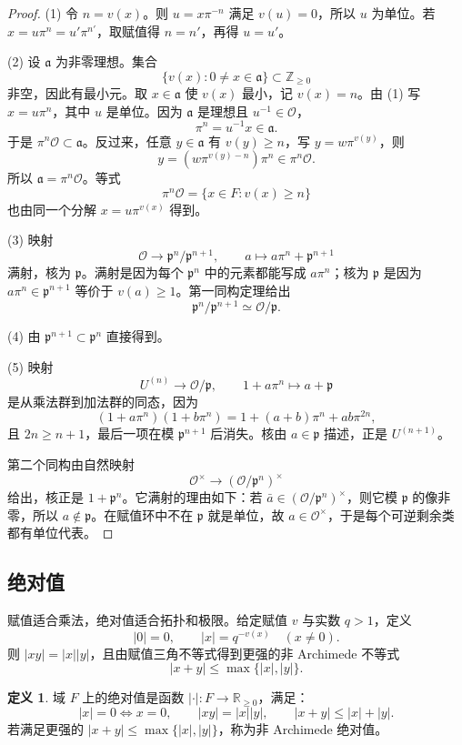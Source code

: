 \documentclass[11pt,a4paper,openany]{ctexbook}
\numberwithin{equation}{chapter}
\newcommand{\R}{\mathbb{R}}
\newcommand{\Z}{\mathbb{Z}}
\theoremstyle{plain}
\theoremstyle{definition}
\newtheorem{definition}[theorem]{定义}
\theoremstyle{remark}
\begin{document}
\begin{proof}
(1) 令 $n=v(x)$。则 $u=x\pi^{-n}$ 满足 $v(u)=0$，所以 $u$ 为单位。若 $x=u\pi^n=u'\pi^{n'}$，取赋值得 $n=n'$，再得 $u=u'$。

(2) 设 $\mathfrak a$ 为非零理想。集合
\[
\{v(x):0\ne x\in\mathfrak a\}\subset\Z_{\ge0}
\]
非空，因此有最小元。取 $x\in\mathfrak a$ 使 $v(x)$ 最小，记 $v(x)=n$。由 (1) 写
$x=u\pi^n$，其中 $u$ 是单位。因为 $\mathfrak a$ 是理想且 $u^{-1}\in\mathcal O$，
\[
\pi^n=u^{-1}x\in\mathfrak a.
\]
于是 $\pi^n\mathcal O\subset\mathfrak a$。反过来，任意 $y\in\mathfrak a$ 有
$v(y)\ge n$，写 $y=w\pi^{v(y)}$，则
\[
y=(w\pi^{v(y)-n})\pi^n\in\pi^n\mathcal O.
\]
所以 $\mathfrak a=\pi^n\mathcal O$。等式
\[
\pi^n\mathcal O=\{x\in F:v(x)\ge n\}
\]
也由同一个分解 $x=u\pi^{v(x)}$ 得到。

(3) 映射
\[
\mathcal O\to \mathfrak p^n/\mathfrak p^{n+1},\qquad
a\mapsto a\pi^n+\mathfrak p^{n+1}
\]
满射，核为 $\mathfrak p$。满射是因为每个 $\mathfrak p^n$ 中的元素都能写成
$a\pi^n$；核为 $\mathfrak p$ 是因为
$a\pi^n\in\mathfrak p^{n+1}$ 等价于 $v(a)\ge1$。第一同构定理给出
\[
\mathfrak p^n/\mathfrak p^{n+1}\simeq\mathcal O/\mathfrak p.
\]

(4) 由 $\mathfrak p^{n+1}\subset\mathfrak p^n$ 直接得到。

(5) 映射
\[
U^{(n)}\to\mathcal O/\mathfrak p,\qquad
1+a\pi^n\mapsto a+\mathfrak p
\]
是从乘法群到加法群的同态，因为
\[
(1+a\pi^n)(1+b\pi^n)
=1+(a+b)\pi^n+ab\pi^{2n},
\]
且 $2n\ge n+1$，最后一项在模 $\mathfrak p^{n+1}$ 后消失。核由
$a\in\mathfrak p$ 描述，正是 $U^{(n+1)}$。

第二个同构由自然映射
\[
\mathcal O^\times\longrightarrow(\mathcal O/\mathfrak p^n)^\times
\]
给出，核正是 $1+\mathfrak p^n$。它满射的理由如下：若
$\bar a\in(\mathcal O/\mathfrak p^n)^\times$，则它模 $\mathfrak p$ 的像非零，所以
$a\notin\mathfrak p$。在赋值环中不在 $\mathfrak p$ 就是单位，故 $a\in\mathcal O^\times$，于是每个可逆剩余类都有单位代表。
\end{proof}

\subsection{绝对值}

赋值适合乘法，绝对值适合拓扑和极限。给定赋值 $v$ 与实数 $q>1$，定义
\[
|0|=0,\qquad |x|=q^{-v(x)}\quad(x\ne0).
\]
则 $|xy|=|x||y|$，且由赋值三角不等式得到更强的非 Archimede 不等式
\[
|x+y|\le\max\{|x|,|y|\}.
\]

\begin{definition}
域 $F$ 上的绝对值是函数 $|\cdot|:F\to\R_{\ge0}$，满足：
\[
|x|=0\Longleftrightarrow x=0,\qquad
|xy|=|x||y|,\qquad
|x+y|\le |x|+|y|.
\]
若满足更强的 $|x+y|\le\max\{|x|,|y|\}$，称为非 Archimede 绝对值。
\end{definition}
\end{document}
